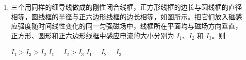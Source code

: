 \documentclass[\gkver]{gaokaozhenti}
\begin{document}
\begin{enumerate}
{解得

$t_{1}=\frac{v_{0}-v}{2a}$

在隧道内匀速有

$t_{2}=\frac{L+l}{v}$

列车尾部出隧道后立即加速到 $v_{0}$，有

$v_{0}=v+at_{3}$

解得

$t_{3}=\frac{v_{0}-v}{a}$

则列车从减速开始至回到正常行驶速率 $v_{0}$ 所用时间至少为

$t=\frac{3(v_{0}-v)}{2a}+\frac{L+l}{v}$

故选 C。
}

\item
三个用同样的细导线做成的刚性闭合线框，正方形线框的边长与圆线框的直径相等，圆线框的半径与正六边形线框的边长相等，如图所示。把它们放入磁感应强度随时间线性变化的同一匀强磁场中，线框所在平面均与磁场方向垂直，正方形、圆形和正六边形线框中感应电流的大小分别为 $I_{1}$、$I_{2}$ 和 $I_{3}$。则


{$I_{1}>I_{3}>I_{2}$}
{$I_{1}=I_{2}>I_{3}$}
{$I_{1}=I_{2}=I_{3}$}

\end{enumerate}
\end{document}
